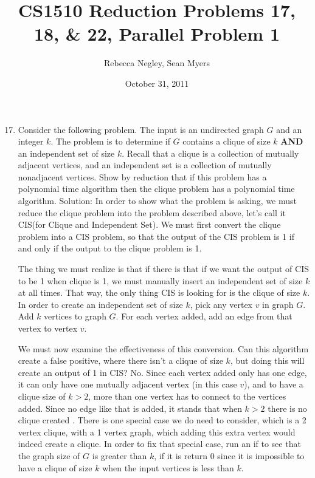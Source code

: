 \documentclass{article}
\title{CS1510  Reduction Problems 17, 18, \& 22, Parallel Problem 1}
\author{Rebecca Negley, Sean Myers}
\date{October 31, 2011}
\begin{document}
\maketitle

\begin{enumerate}
\setcounter{enumi}{16}
\item Consider the following problem. The input is an undirected graph $G$ and an integer $k$. The problem is to determine if $G$ contains a clique of size $k$ \textbf{AND} an independent set of size $k$. Recall that a clique is a collection of mutually adjacent vertices, and an independent set is a collection of mutually nonadjacent vertices. Show by reduction that if this problem has a polynomial time algorithm then the clique problem has a polynomial time algorithm.
\newline
\newline Solution: In order to show what the problem is asking, we must reduce the clique problem into the problem described above, let's call it CIS(for Clique and Independent Set). We must first convert the clique problem into a CIS problem, so that the output of the CIS problem is 1 if and only if the output to the clique problem is 1. 

The thing we must realize is that if there is that if we want the output of CIS to be 1 when clique is 1, we must manually insert an independent set of size $k$ at all times. That way, the only thing CIS is looking for is the clique of size $k$. In order to create an independent set of size $k$, pick any vertex $v$ in graph $G$. Add $k$ vertices to graph $G$. For each vertex added, add an edge from that vertex to vertex $v$. 

We must now examine the effectiveness of this conversion. Can this algorithm create a false positive, where there isn't a clique of size $k$, but doing this will create an output of 1 in CIS? No. Since each vertex added only has one edge, it can only have one mutually adjacent vertex (in this case $v$), and to have a clique size of $k > 2$, more than one vertex has to connect to the vertices added. Since no edge like that is added, it stands that when $k > 2$ there is no clique created . There is one special case we do need to consider, which is a 2 vertex clique, with a 1 vertex graph, which adding this extra vertex would indeed create a clique. In order to fix that special case, run an if to see that the graph size of $G$ is greater than $k$, if it is return 0 since it is impossible to have a clique of size $k$ when the input vertices is less than $k$. 


\end{enumerate}
\end{document}
